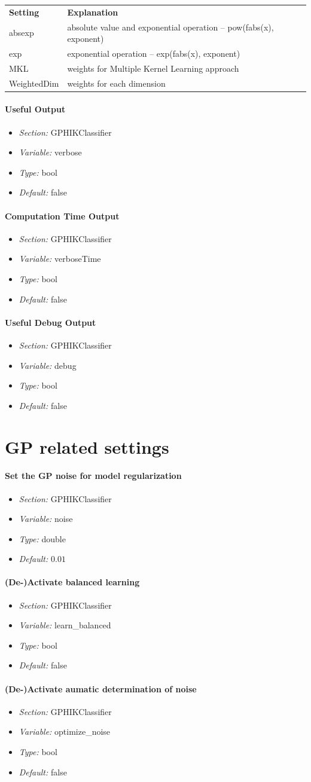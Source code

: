 \documentclass[a4paper]{scrreprt}
\newcommand{\confSection}[1]{\textit{Section: } #1}
\newcommand{\variable}[1]{\textit{Variable: } #1}
\newcommand{\variableType}[1]{\textit{Type: } #1}
\newcommand{\default}[1]{\textit{Default: } #1}
\newcommand{\infos}[4]{
	\begin{itemize}
	  \setlength{\itemsep}{-0.5em}
	  \item \confSection{#1}
	  \item \variable{#2}
	  \item \variableType{#3}
	  \item \default{#4}
	\end{itemize}
     }
\begin{document}
    \begin{tabular}{ll}
      \textbf{Setting} & \textbf{Explanation} \\
	absexp &  absolute value and exponential operation -- pow(fabs(x), exponent)\\
	exp &  exponential operation -- exp(fabs(x), exponent)\\
	MKL &  weights for Multiple Kernel Learning approach\\
	WeightedDim &  weights for each dimension\\
    \end{tabular}

  \paragraph{Useful Output}
    \infos{GPHIKClassifier}{verbose}{bool}{false}

  \paragraph{Computation Time Output}
    \infos{GPHIKClassifier}{verboseTime}{bool}{false}

  \paragraph{Useful Debug Output}
    \infos{GPHIKClassifier}{debug}{bool}{false}

\section{GP related settings}
  \paragraph{Set the GP noise for model regularization}
    \infos{GPHIKClassifier}{noise}{double}{$0.01$}
  \paragraph{(De-)Activate balanced learning}
    \infos{GPHIKClassifier}{learn\_balanced}{bool}{false}
  \paragraph{(De-)Activate aumatic determination of noise}
    \infos{GPHIKClassifier}{optimize\_noise}{bool}{false}


\end{document}
